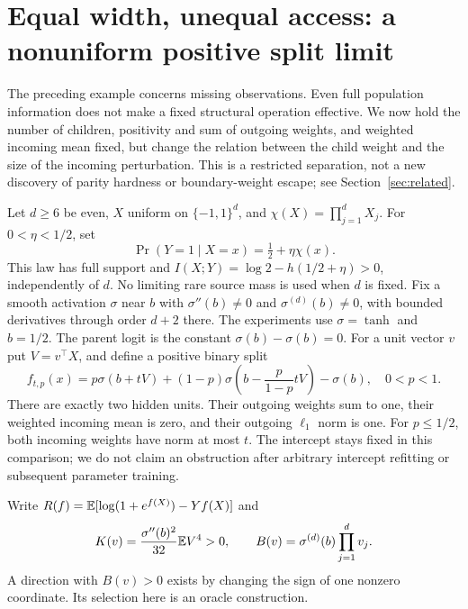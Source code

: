 \section{Equal width, unequal access: a nonuniform positive split limit}
\label{sec:highorder}
The preceding example concerns missing observations. Even full population
information does not make a fixed structural operation effective. We now
hold the number of children, positivity and sum of outgoing weights, and
weighted incoming mean fixed, but change the relation between the child
weight and the size of the incoming perturbation. This is a restricted
separation, not a new discovery of parity hardness or boundary-weight
escape; see Section~\ref{sec:related}.

Let $d\ge6$ be even, $X$ uniform on $\{-1,1\}^d$, and
$\chi(X)=\prod_{j=1}^d X_j$. For $0<\eta<1/2$, set
\begin{equation}\label{eq:paritylaw}
 \Pr(Y=1\mid X=x)=\tfrac12+\eta\chi(x).
\end{equation}
This law has full support and $I(X;Y)=\log2-h(1/2+\eta)>0$,
independently of $d$. No limiting rare source mass is used when $d$ is fixed.
Fix a smooth activation $\sigma$ near $b$ with
$\sigma''(b)\ne0$ and $\sigma^{(d)}(b)\ne0$, with bounded derivatives
through order $d+2$ there. The experiments use $\sigma=\tanh$ and $b=1/2$.
The parent logit is the constant $\sigma(b)-\sigma(b)=0$.
For a unit vector $v$ put $V=v^\top X$, and define a positive binary split
\begin{equation}\label{eq:asymmetric}
 f_{t,p}(x)=p\sigma(b+tV)+(1-p)\sigma\left(b-\frac{p}{1-p}tV\right)-\sigma(b),
 \quad 0<p<1.
\end{equation}
There are exactly two hidden units. Their outgoing weights sum to one,
their weighted incoming mean is zero, and their outgoing $\ell_1$ norm is
one. For $p\le1/2$, both incoming weights have norm at most $t$.
The intercept stays fixed in this comparison; we do not claim an obstruction
after arbitrary intercept refitting or subsequent parameter training.

Write $R(f)=\mathbb E[\log(1+e^{f(X)})-Yf(X)]$ and
\begin{equation}\label{eq:KB}
 K(v)=\frac{\sigma''(b)^2}{32}\mathbb E V^4>0,
 \qquad B(v)=\sigma^{(d)}(b)\prod_{j=1}^d v_j.
\end{equation}
A direction with $B(v)>0$ exists by changing the sign of one nonzero
coordinate. Its selection here is an oracle construction.

